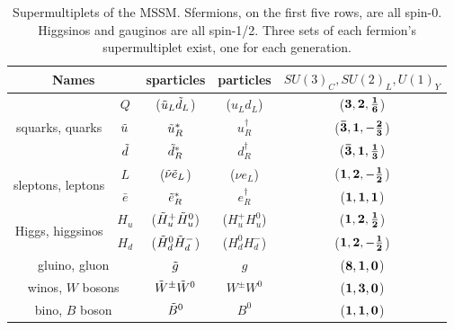 \begin{table}
\begin{center}
 \begin{tabular}{cc|c|c|c}
   \hline 
   \multicolumn{2}{c|}{Names} & sparticles & particles & $SU(3)_C, SU(2)_L, U(1)_Y$ \\
   \hline
   \hline
   \multirow{3}{*}{squarks, quarks} & $Q$ 		& ($\squ[L] \sqd[L]$) & ($u_L d_L$) 		& ($\bf{3}, \bf{2}, \frac{1}{6}$) 		\\
   									& $\squ$ 	& $\squ[R]^*$ 		& $u^\dagger_R$ 	& ($\bf{\bar{3}}, \bf{1}, -\frac{2}{3}$) 	\\
   									& $\sqd$ 	& $\sqd[R]^*$ 		& $d^\dagger_R$ 	& ($\bf{\bar{3}}, \bf{1}, \frac{1}{3}$) 	\\		
   \hline
   \multirow{2}{*}{sleptons, leptons} & $L$ 	& ($\slneu \sle[L]$) & ($\nu e_L$) 		& ($\bf{1}, \bf{2}, -\frac{1}{2}$) 		\\
   									& $\bar{e}$ & $\sle[R]^*$ 		& $e^\dagger_R$ 	& ($\bf{1}, \bf{1}, 1$) 					\\
   \hline
   \multirow{2}{*}{Higgs, higgsinos} & $H_u$ 	& ($\Hou[+] \Hou[0]$) 	& ($H^+_u H^0_u$)  & ($\bf{1}, \bf{2}, \frac{1}{2}$) 	\\
   									& $H_d$ 	& ($\Hod[0] \Hod[-]$) 	& ($H^0_d H^-_d$)  & ($\bf{1}, \bf{2}, -\frac{1}{2}$) 	\\  
   \hline
   \multicolumn{2}{c|}{gluino, gluon}	& $\go$ 			& $g$			& ($\bf{8}, \bf{1}, 0$)		\\							
   \hline
   \multicolumn{2}{c|}{winos, $W$ bosons}	& $\Wo^\pm \Wo^0$ 	& $W^\pm W^0$	& ($\bf{1}, \bf{3}, 0$)		\\							
   \hline
   \multicolumn{2}{c|}{bino, $B$ boson}	& $\Bo^0$ 			& $B^0$			& ($\bf{1}, \bf{1}, 0$)		\\							

\hline
\hline
 \end{tabular}
\end{center}
 \caption{Supermultiplets of the \ac{MSSM}. Sfermions, on the first five rows, are all spin-0. Higgsinos and gauginos are all spin-1/2. Three sets of each fermion's supermultiplet exist, one for each generation. \cite{Martin:1997ns}}
 \label{tab:sparticles}
\end{table}




